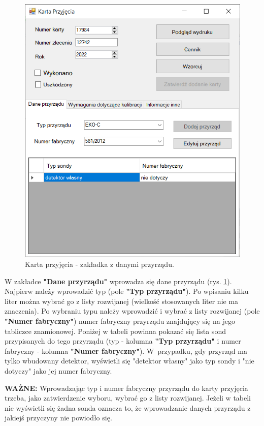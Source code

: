 \begin{figure}[htb]
	\centering
	\includegraphics{obrazki/Biuro/karta/karta_dane_przyrzadu.png}
	\caption{Karta przyjęcia - zakładka z danymi przyrządu.}
	\label{kartaDanePrzyrzadu}
\end{figure}

W zakładce \textbf{"Dane przyrządu"} wprowadza się dane przyrządu (rys. \ref{kartaDanePrzyrzadu}). Najpierw należy wprowadzić typ (pole \textbf{"Typ przyrządu"}). Po wpisaniu kilku liter można wybrać go z listy rozwijanej (wielkość stosowanych liter nie ma znaczenia). Po wybraniu typu należy wprowadzić i wybrać z listy rozwijanej (pole \textbf{"Numer fabryczny"}) numer fabryczny przyrządu znajdujący się na jego tabliczce znamionowej. Poniżej w tabeli powinna pokazać się lista sond przypisanych do tego przyrządu (typ - kolumna \textbf{"Typ przyrządu"} i numer fabryczny - kolumna \textbf{"Numer fabryczny"}). W~przypadku, gdy przyrząd ma tylko wbudowany detektor, wyświetli się "detektor własny" jako typ sondy i "nie dotyczy" jako jej numer fabryczny. 

\textbf{WAŻNE:} Wprowadzając typ i numer fabryczny przyrządu do karty przyjęcia trzeba, jako zatwierdzenie wyboru, wybrać go z listy rozwijanej. Jeżeli w tabeli nie wyświetli się żadna sonda oznacza to, że wprowadzanie danych przyrządu z jakiejś przyczyny nie powiodło się.

